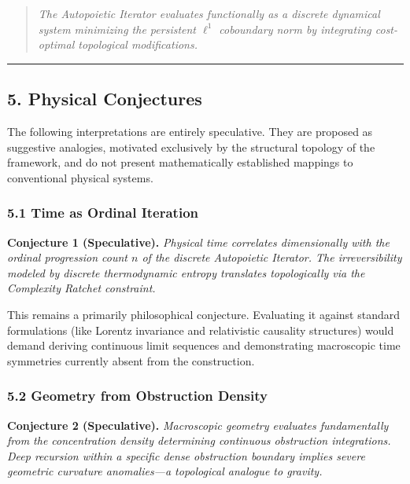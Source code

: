\documentclass[
]{article}
\begin{document}
\begin{quote}
\emph{The Autopoietic Iterator evaluates functionally as a discrete
dynamical system minimizing the persistent \(\ell^1\) coboundary norm by
integrating cost-optimal topological modifications.}
\end{quote}

\begin{center}\rule{0.5\linewidth}{0.5pt}\end{center}

\subsection{5. Physical Conjectures}\label{physical-conjectures}

The following interpretations are entirely speculative. They are
proposed as suggestive analogies, motivated exclusively by the
structural topology of the framework, and do not present mathematically
established mappings to conventional physical systems.

\subsubsection{5.1 Time as Ordinal
Iteration}\label{time-as-ordinal-iteration}

\textbf{Conjecture 1 (Speculative).} \emph{Physical time correlates
dimensionally with the ordinal progression count \(n\) of the discrete
Autopoietic Iterator. The irreversibility modeled by discrete
thermodynamic entropy translates topologically via the Complexity
Ratchet constraint.}

This remains a primarily philosophical conjecture. Evaluating it against
standard formulations (like Lorentz invariance and relativistic
causality structures) would demand deriving continuous limit sequences
and demonstrating macroscopic time symmetries currently absent from the
construction.

\subsubsection{5.2 Geometry from Obstruction
Density}\label{geometry-from-obstruction-density}

\textbf{Conjecture 2 (Speculative).} \emph{Macroscopic geometry
evaluates fundamentally from the concentration density determining
continuous obstruction integrations. Deep recursion within a specific
dense obstruction boundary implies severe geometric curvature
anomalies---a topological analogue to gravity.}
\end{document}
